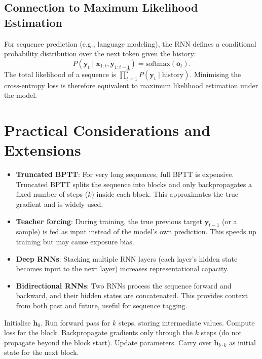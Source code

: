 \documentclass{tufte-handout}
\begin{document}
\subsection{Connection to Maximum Likelihood Estimation}

For sequence prediction (e.g., language modeling), the RNN defines a conditional probability distribution over the next token given the history:
\[
P(\mathbf{y}_t \mid \mathbf{x}_{1:t}, \mathbf{y}_{1:t-1}) = \text{softmax}(\mathbf{o}_t).
\]
The total likelihood of a sequence is $\prod_{t=1}^T P(\mathbf{y}_t \mid \text{history})$. Minimising the cross‑entropy loss is therefore equivalent to maximum likelihood estimation under the model.

\section{Practical Considerations and Extensions}

\begin{itemize}
    \item \textbf{Truncated BPTT}: For very long sequences, full BPTT is expensive. Truncated BPTT splits the sequence into blocks and only backpropagates a fixed number of steps ($k$) inside each block. This approximates the true gradient and is widely used.
    \item \textbf{Teacher forcing}: During training, the true previous target $\mathbf{y}_{t-1}$ (or a sample) is fed as input instead of the model’s own prediction. This speeds up training but may cause exposure bias.
    \item \textbf{Deep RNNs}: Stacking multiple RNN layers (each layer’s hidden state becomes input to the next layer) increases representational capacity.
    \item \textbf{Bidirectional RNNs}: Two RNNs process the sequence forward and backward, and their hidden states are concatenated. This provides context from both past and future, useful for sequence tagging.
\end{itemize}

\begin{algorithm}[h]
    \caption{Truncated BPTT (with block size $k$)}
    \begin{algorithmic}[1]
        \State Initialise $\mathbf{h}_0$.
            \State Run forward pass for $k$ steps, storing intermediate values.
            \State Compute loss for the block.
            \State Backpropagate gradients only through the $k$ steps (do not propagate beyond the block start).
            \State Update parameters.
            \State Carry over $\mathbf{h}_{b \cdot k}$ as initial state for the next block.
        \EndFor
    \end{algorithmic}
\end{algorithm}
\end{document}
